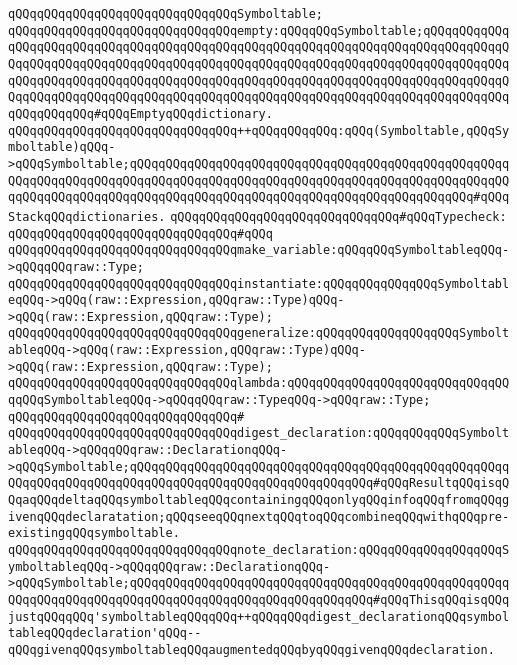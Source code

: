 \verb|qQQqqQQqqQQqqQQqqQQqqQQqqQQqqQQqSymboltable;|\newline
\newline
\verb|qQQqqQQqqQQqqQQqqQQqqQQqqQQqqQQqempty:qQQqqQQqSymboltable;qQQqqQQqqQQqqQQqqQQqqQQqqQQqqQQqqQQqqQQqqQQqqQQqqQQqqQQqqQQqqQQqqQQqqQQqqQQqqQQqqQQqqQQqqQQqqQQqqQQqqQQqqQQqqQQqqQQqqQQqqQQqqQQqqQQqqQQqqQQqqQQqqQQqqQQqqQQqqQQqqQQqqQQqqQQqqQQqqQQqqQQqqQQqqQQqqQQqqQQqqQQqqQQqqQQqqQQqqQQqqQQqqQQqqQQqqQQqqQQqqQQqqQQqqQQqqQQqqQQqqQQqqQQqqQQqqQQqqQQqqQQqqQQqqQQqqQQqqQQqqQQq#qQQqEmptyqQQqdictionary.|\newline
\verb|qQQqqQQqqQQqqQQqqQQqqQQqqQQqqQQq++qQQqqQQqqQQq:qQQq(Symboltable,qQQqSymboltable)qQQq->qQQqSymboltable;qQQqqQQqqQQqqQQqqQQqqQQqqQQqqQQqqQQqqQQqqQQqqQQqqQQqqQQqqQQqqQQqqQQqqQQqqQQqqQQqqQQqqQQqqQQqqQQqqQQqqQQqqQQqqQQqqQQqqQQqqQQqqQQqqQQqqQQqqQQqqQQqqQQqqQQqqQQqqQQqqQQqqQQqqQQqqQQqqQQqqQQqqQQq#qQQqStackqQQqdictionaries.|\newline
\newline
\verb|qQQqqQQqqQQqqQQqqQQqqQQqqQQqqQQq#qQQqTypecheck:|\newline
\verb|qQQqqQQqqQQqqQQqqQQqqQQqqQQqqQQq#qQQq|\newline
\verb|qQQqqQQqqQQqqQQqqQQqqQQqqQQqqQQqmake_variable:qQQqqQQqSymboltableqQQq->qQQqqQQqraw::Type;|\newline
\verb|qQQqqQQqqQQqqQQqqQQqqQQqqQQqqQQqinstantiate:qQQqqQQqqQQqqQQqSymboltableqQQq->qQQq(raw::Expression,qQQqraw::Type)qQQq->qQQq(raw::Expression,qQQqraw::Type);|\newline
\verb|qQQqqQQqqQQqqQQqqQQqqQQqqQQqqQQqgeneralize:qQQqqQQqqQQqqQQqqQQqSymboltableqQQq->qQQq(raw::Expression,qQQqraw::Type)qQQq->qQQq(raw::Expression,qQQqraw::Type);|\newline
\verb|qQQqqQQqqQQqqQQqqQQqqQQqqQQqqQQqlambda:qQQqqQQqqQQqqQQqqQQqqQQqqQQqqQQqqQQqSymboltableqQQq->qQQqqQQqraw::TypeqQQq->qQQqraw::Type;|\newline
\verb|qQQqqQQqqQQqqQQqqQQqqQQqqQQqqQQq#|\newline
\verb|qQQqqQQqqQQqqQQqqQQqqQQqqQQqqQQqdigest_declaration:qQQqqQQqqQQqSymboltableqQQq->qQQqqQQqraw::DeclarationqQQq->qQQqSymboltable;qQQqqQQqqQQqqQQqqQQqqQQqqQQqqQQqqQQqqQQqqQQqqQQqqQQqqQQqqQQqqQQqqQQqqQQqqQQqqQQqqQQqqQQqqQQqqQQqqQQqqQQq#qQQqResultqQQqisqQQqaqQQqdeltaqQQqsymboltableqQQqcontainingqQQqonlyqQQqinfoqQQqfromqQQqgivenqQQqdeclaratation;qQQqseeqQQqnextqQQqtoqQQqcombineqQQqwithqQQqpre-existingqQQqsymboltable.|\newline
\verb|qQQqqQQqqQQqqQQqqQQqqQQqqQQqqQQqnote_declaration:qQQqqQQqqQQqqQQqqQQqSymboltableqQQq->qQQqqQQqraw::DeclarationqQQq->qQQqSymboltable;qQQqqQQqqQQqqQQqqQQqqQQqqQQqqQQqqQQqqQQqqQQqqQQqqQQqqQQqqQQqqQQqqQQqqQQqqQQqqQQqqQQqqQQqqQQqqQQqqQQqqQQq#qQQqThisqQQqisqQQqjustqQQqqQQq'symboltableqQQqqQQq++qQQqqQQqdigest_declarationqQQqsymboltableqQQqdeclaration'qQQq--qQQqgivenqQQqsymboltableqQQqaugmentedqQQqbyqQQqgivenqQQqdeclaration.|\newline
